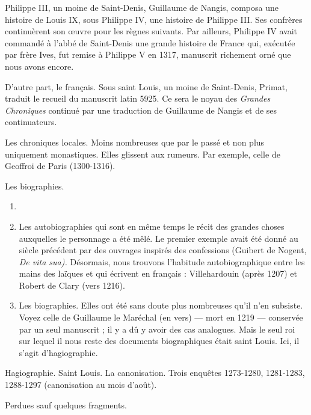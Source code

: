 \documentclass[french,twoside]{book} %
\newcommand{\labelchar}[1]{{\color{rubric}\bf #1}}
\begin{document}
\label{p4} Philippe III, un moine de Saint-Denis, Guillaume de Nangis, composa une histoire de Louis IX, sous Philippe IV, une histoire de Philippe III. Ses confrères continuèrent son œuvre pour les règnes suivants. Par ailleurs, Philippe IV avait commandé à l’abbé de Saint-Denis une grande histoire de France qui, exécutée par frère Ives, fut remise à Philippe V en 1317, manuscrit richement orné que nous avons encore.\par
D’autre part, le français. Sous saint Louis, un moine de Saint-Denis, Primat, traduit le recueil du manuscrit latin 5925. Ce sera le noyau des \emph{Grandes Chroniques} continué par une traduction de Guillaume de Nangis et de ses continuateurs.\par
\bigbreak
\noindent \labelchar{d)} Les chroniques locales. Moins nombreuses que par le passé et non plus uniquement monastiques. Elles glissent aux rumeurs. Par exemple, celle de Geoffroi de Paris (1300-1316).\par
\bigbreak
\noindent \labelchar{e)} Les biographies.\par

\begin{enumerate}[itemsep=0pt,]
\item[] \hspace{-1.5em}{\bfseries Il faut distinguer deux catégories :}
\item Les autobiographies qui sont en même temps le récit des grandes choses auxquelles le personnage a été mêlé. Le premier exemple avait été donné au siècle précédent par des ouvrages inspirés des confessions (Guibert de Nogent, {\itshape De vita sua).} Désormais, nous trouvons l’habitude autobiographique entre les mains des laïques et qui écrivent en français : Villehardouin (après 1207) et Robert de Clary (vers 1216).
\item Les biographies. Elles ont été sans doute plus nombreuses qu’il n’en subsiste. Voyez celle de Guillaume le Maréchal (en vers) — mort en 1219 — conservée par un seul manuscrit ; il y a dû y avoir des cas analogues. Mais le seul roi sur lequel il nous reste des documents biographiques était saint Louis. Ici, il s’agit d’hagiographie.

\end{enumerate}\bigbreak
\noindent \labelchar{f)} Hagiographie. Saint Louis. La canonisation. Trois enquêtes 1273-1280, 1281-1283, 1288-1297 (canonisation au mois d’août).\par
Perdues sauf quelques fragments.\par
\end{document}
